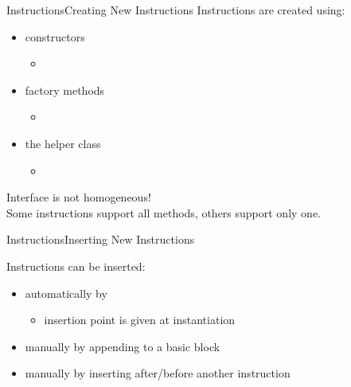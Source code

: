 \begin{frame}{Instructions}{Creating New Instructions}
Instructions are created using:

\begin{itemize}
\item constructors
\begin{itemize}
\item {}
\end{itemize}
\item factory methods
\begin{itemize}
\item {}
\end{itemize}
\item the helper class 
\begin{itemize}
\item {}\\
\end{itemize}
\end{itemize}
\vfill
\alert{Interface is not homogeneous!}\\
Some instructions support all methods, others support only one.
\end{frame}


\begin{frame}{Instructions}{Inserting New Instructions}


\vfill
Instructions can be inserted:
\vfill
\begin{itemize}
\item automatically by 
\begin{itemize}
\item insertion point is given at  instantiation
\end{itemize}
\bigskip
\item manually by appending to a basic block
\item manually by inserting after/before another instruction
\end{itemize}
\vfill
\end{frame}


